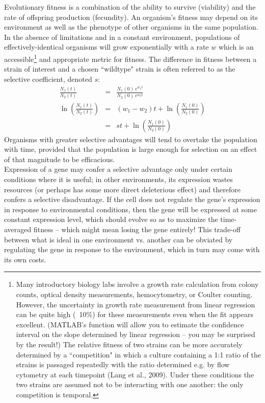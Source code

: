 \documentclass{article}
\begin{document}
Evolutionary fitness is a combination of the ability to survive (viability) and the rate of offspring production (fecundity). An organism's fitness may depend on its environment as well as the phenotype of other organisms in the same population. In the absence of limitations and in a constant environment, populations of effectively-identical organisms will grow exponentially with a rate $w$ which is an accessible\footnote{Many introductory biology labs involve a growth rate calculation from colony counts, optical density measurements, hemocytometry, or Coulter counting. However, the uncertainty in growth rate measurement from linear regression can be quite high (~10\%) for these measurements even when the fit appears excellent. (MATLAB's  function will allow you to estimate the confidence interval on the slope determined by linear regression -- you may be surprised by the result!) The relative fitness of two strains can be more accurately determined by a ``competition" in which a culture containing a 1:1 ratio of the strains is passaged repeatedly with the ratio determined e.g. by flow cytometry at each timepoint (Lang et al., 2009). Under these conditions the two strains are assumed not to be interacting with one another: the only competition is temporal.} and appropriate metric for fitness. The difference in fitness between a strain of interest and a chosen ``wildtype" strain is often referred to as the selective coefficient, denoted $s$:
\begin{eqnarray*}
\frac{N_{1} (t)}{N_{2} (t)} & = & \frac{N_1(0) \, e^{w_1 t}}{N_2(0) \, e^{w_2 t}}\\
\ln \left( \frac{N_{1} (t)}{N_{2} (t)}\right) & = & \left( w_1 - w_2 \right) t + \ln \left( \frac{N_1(0)}{N_2(0)} \right)\\
& = & st + \ln \left( \frac{N_1(0)}{N_2(0)} \right)
\end{eqnarray*}
Organisms with greater selective advantages will tend to overtake the population with time, provided that the population is large enough for selection on an effect of that magnitude to be efficacious.\\

Expression of a gene may confer a selective advantage only under certain conditions where it is useful; in other environments, its expression wastes resources (or perhaps has some more direct deleterious effect) and therefore confers a selective disadvantage. If the cell does not regulate the gene's expression in response to environmental conditions, then the gene will be expressed at some constant expression level, which should evolve so as to maximize the time-averaged fitness -- which might mean losing the gene entirely! This trade-off between what is ideal in one environment vs. another can be obviated by regulating the gene in response to the environment, which in turn may come with its own costs.
\end{document}
